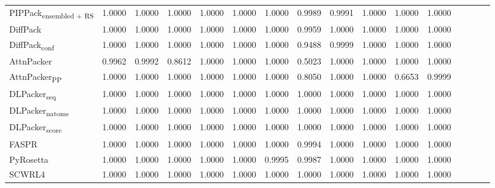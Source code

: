\begin{table}
{\begin{tabular}{@{}lccccccccccccccc@{}}
                \textnormal{\hspace{0.5cm}PIPPack\textsubscript{ensembled + RS}} & 1.0000 & 1.0000 & 1.0000 & 1.0000 & 1.0000 & 1.0000 & 0.9989 & 0.9991 & 1.0000 & 1.0000 & 1.0000 \\
                \textnormal{\hspace{0.5cm}DiffPack} & 1.0000 & 1.0000 & 1.0000 & 1.0000 & 1.0000 & 1.0000 & 0.9959 & 1.0000 & 1.0000 & 1.0000 & 1.0000 \\
                \textnormal{\hspace{0.5cm}DiffPack\textsubscript{conf}} & 1.0000 & 1.0000 & 1.0000 & 1.0000 & 1.0000 & 1.0000 & 0.9488 & 0.9999 & 1.0000 & 1.0000 & 1.0000 \\
                \textnormal{\hspace{0.5cm}AttnPacker} & 0.9962 & 0.9992 & 0.8612 & 1.0000 & 1.0000 & 1.0000 & 0.5023 & 1.0000 & 1.0000 & 1.0000 & 1.0000 \\
                \textnormal{\hspace{0.5cm}AttnPacker\textsubscript{PP}} & 1.0000 & 1.0000 & 1.0000 & 1.0000 & 1.0000 & 1.0000 & 0.8050 & 1.0000 & 1.0000 & 0.6653 & 0.9999 \\
                \textnormal{\hspace{0.5cm}DLPacker\textsubscript{seq}} & 1.0000 & 1.0000 & 1.0000 & 1.0000 & 1.0000 & 1.0000 & 1.0000 & 1.0000 & 1.0000 & 1.0000 & 1.0000 \\
                \textnormal{\hspace{0.5cm}DLPacker\textsubscript{natoms}} & 1.0000 & 1.0000 & 1.0000 & 1.0000 & 1.0000 & 1.0000 & 1.0000 & 1.0000 & 1.0000 & 1.0000 & 1.0000 \\
                \textnormal{\hspace{0.5cm}DLPacker\textsubscript{score}} & 1.0000 & 1.0000 & 1.0000 & 1.0000 & 1.0000 & 1.0000 & 1.0000 & 1.0000 & 1.0000 & 1.0000 & 1.0000 \\
                \textnormal{\hspace{0.5cm}FASPR} & 1.0000 & 1.0000 & 1.0000 & 1.0000 & 1.0000 & 1.0000 & 0.9994 & 1.0000 & 1.0000 & 1.0000 & 1.0000 \\
                \textnormal{\hspace{0.5cm}PyRosetta} & 1.0000 & 1.0000 & 1.0000 & 1.0000 & 1.0000 & 0.9995 & 0.9987 & 1.0000 & 1.0000 & 1.0000 & 1.0000 \\
                \textnormal{\hspace{0.5cm}SCWRL4} & 1.0000 & 1.0000 & 1.0000 & 1.0000 & 1.0000 & 1.0000 & 1.0000 & 1.0000 & 1.0000 & 1.0000 & 1.0000 \\

\end{tabular}}
\end{table}
